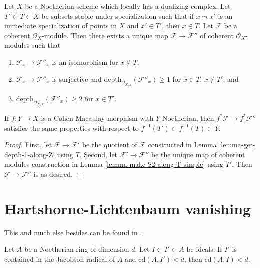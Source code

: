 \begin{lemma}
\label{lemma-make-S2-along-T}
Let $X$ be a Noetherian scheme which locally has a dualizing complex.
Let $T' \subset T \subset X$ be subsets stable under specialization
such that if $x \leadsto x'$ is an immediate specialization
of points in $X$ and $x' \in T'$, then $x \in T$. Let $\mathcal{F}$
be a coherent $\mathcal{O}_X$-module.
Then there exists a unique map $\mathcal{F} \to \mathcal{F}''$
of coherent $\mathcal{O}_X$-modules such that
\begin{enumerate}
\item $\mathcal{F}_x \to \mathcal{F}''_x$ is an isomorphism
for $x \not \in T$,
\item $\mathcal{F}_x \to \mathcal{F}''_x$ is surjective
and $\text{depth}_{\mathcal{O}_{X, x}}(\mathcal{F}''_x) \geq 1$
for $x \in T$, $x \not \in T'$, and
\item $\text{depth}_{\mathcal{O}_{X, x}}(\mathcal{F}''_x) \geq 2$
for $x \in T'$.
\end{enumerate}
If $f : Y \to X$ is a Cohen-Macaulay morphism with $Y$ Noetherian,
then $f^*\mathcal{F} \to f^*\mathcal{F}''$ satisfies the same properties
with respect to $f^{-1}(T') \subset f^{-1}(T) \subset Y$.
\end{lemma}

\begin{proof}
First, let $\mathcal{F} \to \mathcal{F}'$ be the quotient of $\mathcal{F}$
constructed in Lemma \ref{lemma-get-depth-1-along-Z} using $T$.
Second, let $\mathcal{F}' \to \mathcal{F}''$ be the unique
map of coherent modules construction in
Lemma \ref{lemma-make-S2-along-T-simple} using $T'$.
Then $\mathcal{F} \to \mathcal{F}''$ is as desired.
\end{proof}










\section{Hartshorne-Lichtenbaum vanishing}
\label{section-Hartshorne-Lichtenbaum-vanishing}

\noindent
This and much else besides can be found in \cite{CD}.

\begin{lemma}
\label{lemma-cd-top-vanishing}
Let $A$ be a Noetherian ring of dimension $d$. Let $I \subset I' \subset A$
be ideals. If $I'$ is contained in the Jacobson radical
of $A$ and $\text{cd}(A, I') < d$, then $\text{cd}(A, I) < d$.
\end{lemma}


